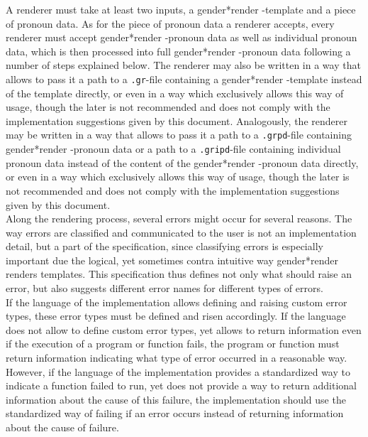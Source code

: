 \documentclass{article}
\newcommand{\GenderRender}{
    gender*render
}
\begin{document}
    A renderer must take at least two inputs, a \GenderRender-template and a piece of pronoun data.
    As for the piece of pronoun data a renderer accepts, every renderer must accept \GenderRender-pronoun data as well as individual pronoun data, which is then processed into full \GenderRender-pronoun data following a number of steps explained below.
    The renderer may also be written in a way that allows to pass it a path to a \texttt{.gr}-file containing a \GenderRender-template instead of the template directly, or even in a way which exclusively allows this way of usage, though the later is not recommended and does not comply with the implementation suggestions given by this document.
    Analogously, the renderer may be written in a way that allows to pass it a path to a \texttt{.grpd}-file containing \GenderRender-pronoun data or a path to a \texttt{.gripd}-file containing individual pronoun data instead of the content of the \GenderRender-pronoun data directly, or even in a way which exclusively allows this way of usage, though the later is not recommended and does not comply with the implementation suggestions given by this document.\\

    Along the rendering process, several errors might occur for several reasons.
    The way errors are classified and communicated to the user is not an implementation detail, but a part of the specification, since classifying errors is especially important due the logical, yet sometimes contra intuitive way \GenderRender renders templates.
    This specification thus defines not only what should raise an error, but also suggests different error names for different types of errors.\\

    If the language of the implementation allows defining and raising custom error types, these error types must be defined and risen accordingly.
    If the language does not allow to define custom error types, yet allows to return information even if the execution of a program or function fails, the program or function must return information indicating what type of error occurred in a reasonable way.
    However, if the language of the implementation provides a standardized way to indicate a function failed to run, yet does not provide a way to return additional information about the cause of this failure, the implementation should use the standardized way of failing if an error occurs instead of returning information about the cause of failure.\\
\end{document}
